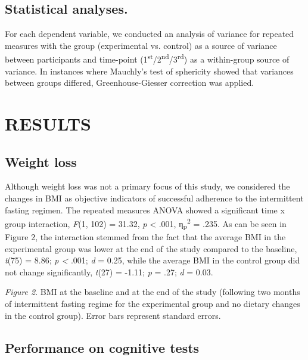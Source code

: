 \documentclass[authordate, empirical]{jote-new-article}
\begin{document}
\subsection{Statistical analyses.}



For each dependent variable, we conducted an analysis of variance for repeated measures with the group (experimental vs. control) as a source of variance between participants and time-point (1\textsuperscript{st}/2\textsuperscript{nd}/3\textsuperscript{rd}) as a within-group source of variance. In instances where Mauchly's test of sphericity showed that variances between groups differed, Greenhouse-Giesser correction was applied.



\section{RESULTS }



\subsection{Weight loss}



Although weight loss was not a primary focus of this study, we considered the changes in BMI as objective indicators of successful adherence to the intermittent fasting regimen. The repeated measures ANOVA showed a significant time x group interaction, \emph{F}(1, 102) = 31.32, \emph{p} < .001, η\textsubscript{p}\textsuperscript{2} = .235. As can be seen in Figure 2, the interaction stemmed from the fact that the average BMI in the experimental group was lower at the end of the study compared to the baseline, \emph{t}(75)\emph{ }= 8.86; \emph{p < }.001; \emph{d} = 0.25, while the average BMI in the control group did not change significantly, \emph{t}(27) = -1.11; \emph{p }= .27; \emph{d} = 0.03.






\emph{Figure 2}. BMI at the baseline and at the end of the study (following two months of intermittent fasting regime for the experimental group and no dietary changes in the control group). Error bars represent standard errors.



\subsection{Performance on cognitive tests}
\end{document}
